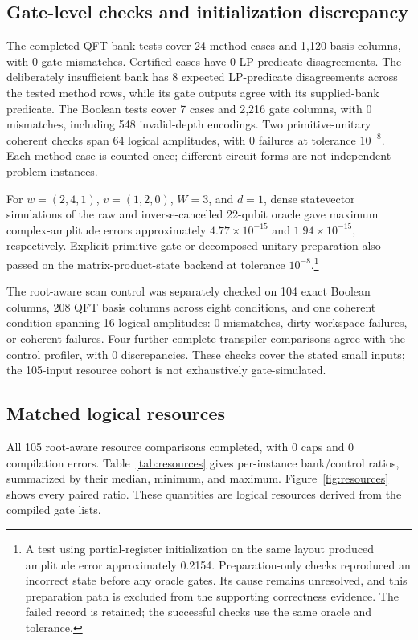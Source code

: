 \documentclass[referee,pdflatex,sn-mathphys-num]{sn-jnl}
\theoremstyle{thmstyleone}
\theoremstyle{thmstyletwo}
\begin{document}
\subsection{Gate-level checks and initialization discrepancy}
The completed QFT bank tests cover 24 method-cases and 1,120 basis columns, with 0 gate mismatches. Certified cases have 0 LP-predicate disagreements. The deliberately insufficient bank has 8 expected LP-predicate disagreements across the tested method rows, while its gate outputs agree with its supplied-bank predicate. The Boolean tests cover 7 cases and 2,216 gate columns, with 0 mismatches, including 548 invalid-depth encodings. Two primitive-unitary coherent checks span 64 logical amplitudes, with 0 failures at tolerance $10^{-8}$. Each method-case is counted once; different circuit forms are not independent problem instances.

For $w=(2,4,1)$, $v=(1,2,0)$, $W=3$, and $d=1$, dense statevector simulations of the raw and inverse-cancelled 22-qubit oracle gave maximum complex-amplitude errors approximately $4.77\times10^{-15}$ and $1.94\times10^{-15}$, respectively. Explicit primitive-gate or decomposed unitary preparation also passed on the matrix-product-state backend at tolerance $10^{-8}$.\footnote{A test using partial-register initialization on the same layout produced amplitude error approximately 0.2154. Preparation-only checks reproduced an incorrect state before any oracle gates. Its cause remains unresolved, and this preparation path is excluded from the supporting correctness evidence. The failed record is retained; the successful checks use the same oracle and tolerance.}

The root-aware scan control was separately checked on 104 exact Boolean columns, 208 QFT basis columns across eight conditions, and one coherent condition spanning 16 logical amplitudes: 0 mismatches, dirty-workspace failures, or coherent failures. Four further complete-transpiler comparisons agree with the control profiler, with 0 discrepancies. These checks cover the stated small inputs; the 105-input resource cohort is not exhaustively gate-simulated.

\subsection{Matched logical resources}
All 105 root-aware resource comparisons completed, with 0 caps and 0 compilation errors. Table~\ref{tab:resources} gives per-instance bank/control ratios, summarized by their median, minimum, and maximum. Figure~\ref{fig:resources} shows every paired ratio. These quantities are logical resources derived from the compiled gate lists.
\end{document}
